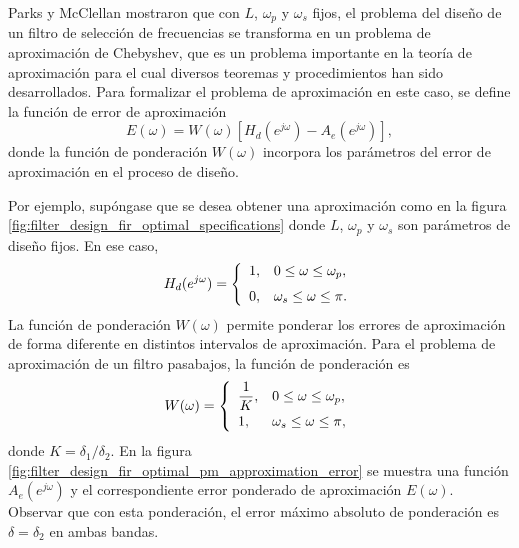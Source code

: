 \documentclass[a4paper]{report}
\begin{document}
Parks y McClellan mostraron que con \(L\), \(\omega_p\) y \(\omega_s\) fijos, el problema del diseño de un filtro de selección de frecuencias se transforma en un problema de aproximación de Chebyshev, que es un problema importante en la teoría de aproximación para el cual diversos teoremas y procedimientos han sido desarrollados. Para formalizar el problema de aproximación en este caso, se define la función de error de aproximación
\begin{equation}\label{eq:filter_design_fir_optimal_weighted_approximation_error}
 E(\omega)=W(\omega)[H_d(e^{j\omega})-A_e(e^{j\omega})],
\end{equation}
donde la función de ponderación \(W(\omega)\) incorpora los parámetros del error de aproximación en el proceso de diseño.

Por ejemplo, supóngase que se desea obtener una aproximación como en la figura \ref{fig:filter_design_fir_optimal_specifications} donde \(L\), \(\omega_p\) y \(\omega_s\) son parámetros de diseño fijos. En ese caso,
\begin{equation}\label{eq:filter_design_fir_optimal_desired_freq_response_lp}
 H_d(e^{j\omega})=
 \left\{ 
 \begin{array}{ll}
  1, & 0\leq \omega\leq\omega_p,\\[\medskipamount]
  0, & \omega_s\leq \omega\leq\pi.
 \end{array}
 \right. 
\end{equation}
La función de ponderación \(W(\omega)\) permite ponderar los errores de aproximación de forma diferente en distintos intervalos de aproximación. Para el problema de aproximación de un filtro pasabajos, la función de ponderación es
\begin{equation}\label{eq:filter_design_fir_optimal_weight_function_lp}
 W(\omega)=
 \left\{ 
 \begin{array}{ll}
  \dfrac{1}{K}, & 0\leq \omega\leq\omega_p,\\[\medskipamount]
  1, & \omega_s\leq \omega\leq\pi,
 \end{array}
 \right. 
\end{equation}
donde \(K=\delta_1/\delta_2\). En la figura \ref{fig:filter_design_fir_optimal_pm_approximation_error} se muestra una función \(A_e(e^{j\omega})\) y el correspondiente error ponderado de aproximación \(E(\omega)\). Observar que con esta ponderación, el error máximo absoluto de ponderación es \(\delta=\delta_2\) en ambas bandas.
\end{document}
